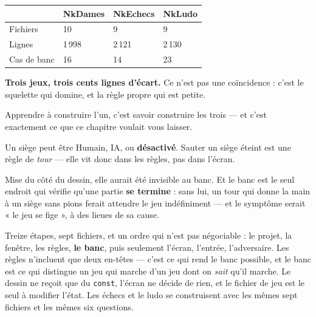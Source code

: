 \begin{center}
\begin{tabular}{@{}llll@{}}
\toprule
& \textbf{NkDames} & \textbf{NkEchecs} & \textbf{NkLudo} \\
\midrule
Fichiers & 10 & 9 & 9 \\
Lignes & 1\,998 & 2\,121 & 2\,130 \\
Cas de banc & 16 & 14 & 23 \\
\bottomrule
\end{tabular}
\end{center}

\begin{nkretenir}
\textbf{Trois jeux, trois cents lignes d'écart.} Ce n'est pas une coïncidence :
c'est le squelette qui domine, et la règle propre qui est petite.

Apprendre à construire l'un, c'est savoir construire les trois --- et c'est
exactement ce que ce chapitre voulait vous laisser.
\end{nkretenir}

\begin{nkretenir}
Un siège peut être Humain, IA, ou \textbf{désactivé}. Sauter un siège éteint est
une règle de \emph{tour} --- elle vit donc dans les règles, pas dans l'écran.

Mise du côté du dessin, elle aurait été invisible au banc. Et le banc est le seul
endroit qui vérifie qu'une partie \textbf{se termine} : sans lui, un tour qui
donne la main à un siège sans pions ferait attendre le jeu indéfiniment --- et le
symptôme serait « le jeu se fige », à des lieues de sa cause.
\end{nkretenir}

\begin{nkbilan}
Treize étapes, sept fichiers, et un ordre qui n'est pas négociable : le projet,
la fenêtre, les règles, \textbf{le banc}, puis seulement l'écran, l'entrée,
l'adversaire. Les règles n'incluent que deux en-têtes --- c'est ce qui rend le
banc possible, et le banc est ce qui distingue un jeu qui marche d'un jeu dont
on \emph{sait} qu'il marche. Le dessin ne reçoit que du \texttt{const}, l'écran
ne décide de rien, et le fichier de jeu est le seul à modifier l'état. Les
échecs et le ludo se construisent avec les mêmes sept fichiers et les mêmes six
questions.
\end{nkbilan}

